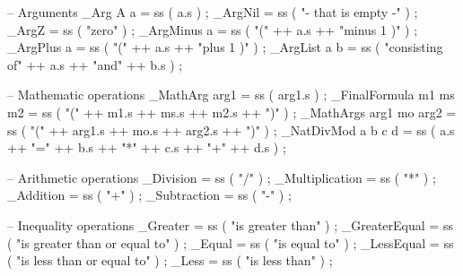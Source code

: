 \begin{lstgf}
{        -- Arguments
        _Arg A a                        = ss ( a.s ) ;
        _ArgNil                         = ss ( "- that is empty -" ) ;
        _ArgZ                           = ss ( "zero" ) ;
        _ArgMinus a                     = ss ( "(" ++ a.s ++ "minus 1 )" ) ;
        _ArgPlus a                      = ss ( "(" ++ a.s ++ "plus 1 )" ) ;
        _ArgList a b                    = ss ( "consisting of" ++ a.s ++ "and" ++ b.s ) ;

        -- Mathematic operations
        _MathArg arg1                   = ss ( arg1.s ) ;
        _FinalFormula m1 ms m2          = ss ( "(" ++ m1.s ++ ms.s ++ m2.s ++ ")" ) ;
        _MathArgs arg1 mo arg2          = ss ( "(" ++ arg1.s ++ mo.s ++ arg2.s ++ ")" ) ;
        _NatDivMod a b c d              = ss ( a.s ++ "=" ++ b.s ++ "*" ++ c.s ++ "+" ++ d.s ) ;

        -- Arithmetic operations
        _Division                       = ss ( "/" ) ;
        _Multiplication                 = ss ( "*" ) ;
        _Addition                       = ss ( "+" ) ;
        _Subtraction                    = ss ( "-" ) ;

        -- Inequality operations
        _Greater                        = ss ( "is greater than" ) ;
        _GreaterEqual                   = ss ( "is greater than or equal to" ) ;
        _Equal                          = ss ( "is equal to" ) ;
        _LessEqual                      = ss ( "is less than or equal to" ) ;
        _Less                           = ss ( "is less than" ) ;

}
\end{lstgf}